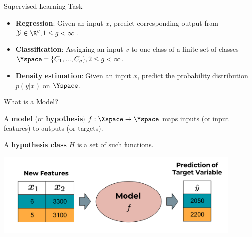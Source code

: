 \begin{frame}{Supervised Learning Task}

\begin{itemize}
\item \textbf{Regression}: Given an input $x$, predict corresponding output from $\mathcal{Y} \in \R^g, 1 \leq g < \infty$.
\item \textbf{Classification}: Assigning an input $x$ to one class of a finite set of classes $\Yspace = \{C_1,...,C_g\}, 2 \leq g < \infty$.
\item \textbf{Density estimation}: Given an input $x$, predict the probability distribution $p(y|x)$ on $\Yspace$.
\end{itemize}

\end{frame}


\begin{frame}{What is a Model?}

A \textbf{model} (or \textbf{hypothesis}) $f : \Xspace \rightarrow \Yspace$ maps inputs (or input features) to outputs (or targets).

A \textbf{hypothesis class} $H$ is a set of such functions.

\scriptsize

\begin{center}\includegraphics[width=0.9\textwidth]{plots/the_model_web} \end{center}

\normalsize 

\end{frame}

